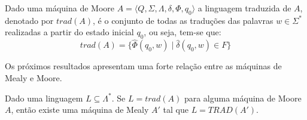 \begin{definition}
	Dado uma máquina de Moore $A = \langle Q, \Sigma, \Lambda, \delta, \Phi, q_0\rangle$ a linguagem traduzida de $A$, denotado por $trad(A)$, é o conjunto de todas as traduções das palavras $w \in \Sigma^*$ realizadas a partir do estado inicial $q_0$, ou seja, tem-se que:
	\begin{equation}
		trad(A) = \{\widehat{\Phi}(q_0, w) \mid  \widehat{\delta}(q_0, w) \in F\}
	\end{equation}
\end{definition}

Os próximos resultados apresentam uma forte relação entre as máquinas de Mealy e Moore.
 
\begin{theorem}\label{teo:Moore-Mealy}
	Dado uma linguagem $L \subseteq \Lambda^*$. Se $L = trad(A)$ para alguma máquina de Moore $A$,  então existe uma máquina de Mealy $A'$ tal que $L = TRAD(A')$.
\end{theorem} 

